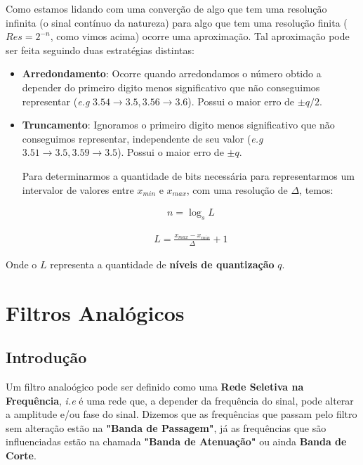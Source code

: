 \documentclass{article}
\begin{document}
Como estamos lidando com uma converção de algo que tem uma resolução infinita (o sinal contínuo da natureza) para algo que tem uma resolução finita ($Res = 2^{-n}$, como vimos acima) ocorre uma aproximação. Tal aproximação pode ser feita seguindo duas estratégias distintas:
\begin{itemize}
    \item \textbf{Arredondamento}: Ocorre quando arredondamos o número obtido a depender do primeiro digito menos significativo que não conseguimos representar (\emph{e.g} $3.54 \rightarrow 3.5, 3.56 \rightarrow 3.6$). Possui o maior erro de $\pm q/2$.
    \item \textbf{Truncamento}: Ignoramos o primeiro digito menos significativo que não conseguimos representar, independente de seu valor (\emph{e.g} $3.51 \rightarrow 3.5, 3.59 \rightarrow 3.5$). Possui o maior erro de $\pm q$.

    Para determinarmos a quantidade de bits necessária para representarmos um intervalor de valores entre $x_{min}$ e $x_{max}$, com uma resolução de $\Delta$, temos:

    \begin{minipage}{0.35\textwidth}
        \begin{align}
            n = \log_s L
        \end{align}
    \end{minipage}
    \begin{minipage}{0.5\textwidth}
        \begin{align}
            L = \frac{x_{max} - x_{min}}{\Delta} + 1
        \end{align}
    \end{minipage}
\end{itemize}

Onde o $L$ representa a quantidade de \textbf{níveis de quantização} $q$.

\newpage
\section{Filtros Analógicos}
\subsection{Introdução}
Um filtro analoógico pode ser definido como uma \textbf{Rede Seletiva na Frequência}, \emph{i.e} é uma rede que, a depender da frequência do sinal, pode alterar a amplitude e/ou fase do sinal. Dizemos que as frequências que passam pelo filtro sem alteração estão na \textbf{"Banda de Passagem"}, já as frequências que são influenciadas estão na chamada \textbf{"Banda de Atenuação"} ou ainda \textbf{Banda de Corte}. 
\end{document}
